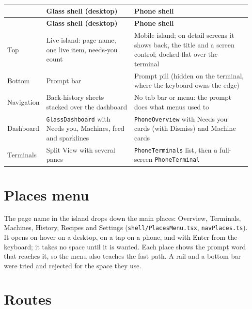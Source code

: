 \begin{small}
\begin{longtable}{>{\raggedright\arraybackslash}p{0.103\dimexpr \linewidth-6\tabcolsep\relax}>{\raggedright\arraybackslash}p{0.382\dimexpr \linewidth-6\tabcolsep\relax}>{\raggedright\arraybackslash}p{0.515\dimexpr \linewidth-6\tabcolsep\relax}}
\toprule
\textbf{} & \textbf{Glass shell (desktop)} & \textbf{Phone shell} \\
\midrule
\endfirsthead
\toprule
\textbf{} & \textbf{Glass shell (desktop)} & \textbf{Phone shell} \\
\midrule
\endhead
Top & Live island: page name, one live item, needs-you count & Mobile island; on detail screens it shows back, the title and a screen control; docked flat over the terminal \\
Bottom & Prompt bar & Prompt pill (hidden on the terminal, where the keyboard owns the edge) \\
Navigation & Back-history sheets stacked over the dashboard & No tab bar or menu: the prompt does what menus used to \\
Dashboard & \texttt{GlassDashboard} with Needs you, Machines, feed and sparklines & \texttt{PhoneOverview} with Needs you cards (with Dismiss) and Machine cards \\
Terminals & Split View with several panes & \texttt{PhoneTerminals} list, then a full-screen \texttt{PhoneTerminal} \\
\bottomrule
\end{longtable}
\end{small}

\section{Places menu}

The page name in the island drops down the main places: Overview, Terminals, Machines, History, Recipes and Settings (\texttt{shell/\allowbreak{}PlacesMenu.\allowbreak{}tsx}, \texttt{navPlaces.\allowbreak{}ts}). It opens on hover on a desktop, on a tap on a phone, and with Enter from the keyboard; it takes no space until it is wanted. Each place shows the prompt word that reaches it, so the menu also teaches the fast path. A rail and a bottom bar were tried and rejected for the space they use.

\section{\texorpdfstring{Routes}{Routes}}

